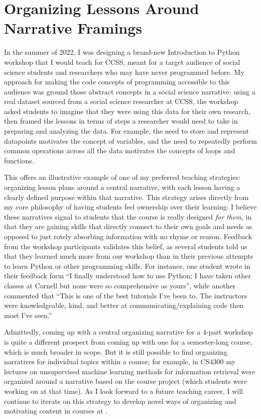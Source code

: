 \documentclass[12pt,letterpaper]{article}
\begin{document}
\section{Organizing Lessons Around Narrative Framings}
In the summer of 2022, I was designing a brand-new Introduction to Python workshop that I would teach for CCSS, meant for a target audience of social science students and researchers who may have never programmed before.
My approach for making the code concepts of programming accessible to this audience was ground those abstract concepts in a social science narrative: using a real dataset sourced from a social science researcher at CCSS, the workshop asked students to imagine that they were using this data for their own research, then framed the lessons in terms of steps a researcher would need to take in preparing and analyzing the data.
For example, the need to store and represent datapoints motivates the concept of variables, and the need to repeatedly perform common operations across all the data motivates the concepts of loops and functions.

This offers an illustrative example of one of my preferred teaching strategies: organizing lesson plans around a central narrative, with each lesson having a clearly defined purpose within that narrative.
This strategy arises directly from my core philosophy of having students feel ownership over their learning: I believe these narratives signal to students that the course is really designed \emph{for them}, in that they are gaining skills that directly connect to their own goals and needs as opposed to just rotely absorbing information with no rhyme or reason.
Feedback from the workshop participants validates this belief, as several students told us that they learned much more from our workshop than in their previous attempts to learn Python or other programming skills.
For instance, one student wrote in their feedback form ``I finally understood how to use Python; I have taken other classes at Cornell but none were so comprehensive as yours'', while another commented that ``This is one of the best tutorials I've been to. The instructors were knowledgeable, kind, and better at communicating/explaining code then most I've seen.''

Admittedly, coming up with a central organizing narrative for a 4-part workshop is quite a different prospect from coming up with one for a semester-long course, which is much broader in scope.
But it is still possible to find organizing narratives for individual topics within a course; for example, in CS4300 my lectures on unsupervised machine learning methods for information retrieval were organized around a narrative based on the course project (which students were working on at that time).
As I look forward to a future teaching career, I will continue to iterate on this strategy to develop novel ways of organizing and motivating content in courses at \schoolname.
\end{document}
